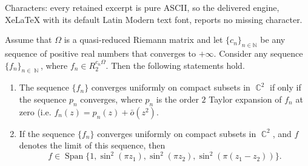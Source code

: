 \documentclass[10pt,a4paper]{amsart}
\DeclareMathOperator{\CC}{\mathbb C}
\DeclareMathOperator{\NN}{\mathbb N}
\DeclareMathOperator{\Span}{Span}
\begin{document}
Characters: every retained excerpt is pure ASCII, so the delivered engine, XeLaTeX with its default Latin Modern text font, reports no missing character.
	\begin{lemma}\label{lemThetaConvergence}
		Assume that $\Omega$ is a quasi-reduced Riemann matrix and let $\{c_n\}_{n \in \mathbb N}$ be any sequence of positive real numbers that converges to $+\infty$. Consider any sequence $\{f_n\}_{n \in \NN}$, where $f_n \in R_2^{c_n \Omega}$. Then the following statements hold.
		\begin{enumerate}[label=(\roman*)]
			\item\label{thetaconvergencei} The sequence $\{f_n\}$ converges uniformly on compact subsets in $\CC^2$ if only if the sequence $p_n$ converges, where $p_n$ is the order $2$ Taylor expansion of $f_n$ at zero (i.e. $f_n(z) = p_n(z) + \bar{o}(z^2)$.
			\item\label{thetaconvergenceii} If the sequence $\{f_n\}$ converges uniformly on compact subsets in $\CC^2$, and $f$ denotes the limit of this sequence, then \[f \in \Span\{1, \sin^2(\pi z_1), \sin^2(\pi z_2),\sin^2(\pi(z_1 - z_2))\}.\]
		\end{enumerate}
	\end{lemma}
\end{document}
